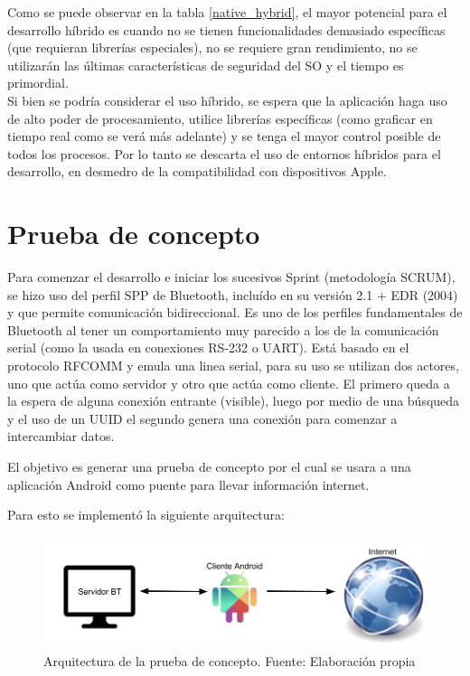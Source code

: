 Como se puede observar en la tabla \ref{native_hybrid}, el mayor potencial para el desarrollo híbrido es cuando no se tienen funcionalidades demasiado específicas (que requieran librerías especiales), no se requiere gran rendimiento, no se utilizarán las últimas características de seguridad del SO y el tiempo es primordial.\\
Si bien se podría considerar el uso híbrido, se espera que la aplicación haga uso de alto poder de procesamiento, utilice librerías específicas (como graficar en tiempo real como se verá más adelante) y se tenga el mayor control posible de todos los procesos. Por lo tanto se descarta el uso de entornos híbridos para el desarrollo, en desmedro de la compatibilidad con dispositivos Apple.


\newpage
\section{Prueba de concepto}

Para comenzar el desarrollo e iniciar los sucesivos Sprint (metodología SCRUM), se hizo uso del perfil SPP de Bluetooth, incluído en su versión 2.1 + EDR (2004) y que permite comunicación bidireccional. Es uno de los perfiles fundamentales de Bluetooth al tener un comportamiento muy parecido a los de la comunicación serial (como la usada en conexiones RS-232 o UART).
Está basado en el protocolo RFCOMM y emula una linea serial, para su uso se utilizan dos actores, uno que actúa como servidor y otro que actúa como cliente. El primero queda a la espera de alguna conexión entrante (visible), luego por medio de una búsqueda y el uso de un UUID el segundo genera una conexión para comenzar a intercambiar datos.

El objetivo es generar una prueba de concepto por el cual se usara a una aplicación Android como puente para llevar información internet.

Para esto se implementó la siguiente arquitectura:

\begin{figure}[H]
	\centering
	\includegraphics[scale=0.4]{figuras/comunicacion/prueba.png}
	\caption{Arquitectura de la prueba de concepto. Fuente: Elaboración propia}
	\label{prueba_concept}
\end{figure}

